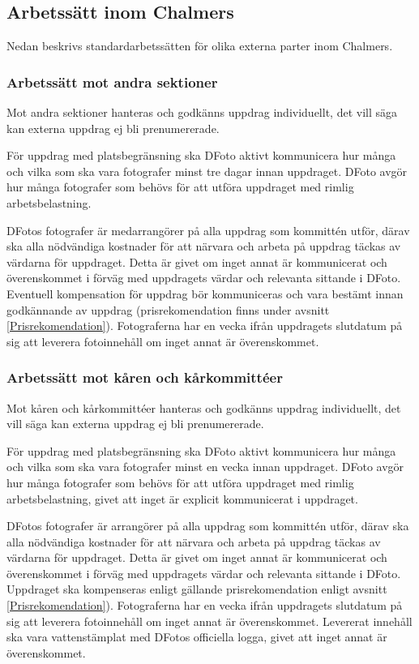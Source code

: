 \subsection{Arbetssätt inom Chalmers}
Nedan beskrivs standardarbetssätten för olika externa parter inom Chalmers. 

\subsubsection{Arbetssätt mot andra sektioner}
Mot andra sektioner hanteras och godkänns uppdrag individuellt, det vill säga kan externa uppdrag ej bli prenumererade.  

För uppdrag med platsbegränsning ska DFoto aktivt kommunicera hur många och vilka som ska vara fotografer minst tre dagar innan uppdraget. DFoto avgör hur många fotografer som behövs för att utföra uppdraget med rimlig arbetsbelastning. 

DFotos fotografer är medarrangörer på alla uppdrag som kommittén utför, därav ska alla nödvändiga kostnader för att närvara och arbeta på uppdrag täckas av värdarna för uppdraget. Detta är givet om inget annat är kommunicerat och överenskommet i förväg med uppdragets värdar och relevanta sittande i DFoto. Eventuell kompensation för uppdrag bör kommuniceras och vara bestämt innan godkännande av uppdrag (prisrekomendation finns under avsnitt \ref{Prisrekomendation}). Fotograferna har en vecka ifrån uppdragets slutdatum på sig att leverera fotoinnehåll om inget annat är överenskommet. 

\subsubsection{Arbetssätt mot kåren och kårkommittéer}
\label{Arbetssätt - Arbetssätt mot kåren och kårkommittéer}
Mot kåren och kårkommittéer hanteras och godkänns uppdrag individuellt, det vill säga kan externa uppdrag ej bli prenumererade.  

För uppdrag med platsbegränsning ska DFoto aktivt kommunicera hur många och vilka som ska vara fotografer minst en vecka innan uppdraget. DFoto avgör hur många fotografer som behövs för att utföra uppdraget med rimlig arbetsbelastning, givet att inget är explicit kommunicerat i uppdraget. 

DFotos fotografer är arrangörer på alla uppdrag som kommittén utför, därav ska alla nödvändiga kostnader för att närvara och arbeta på uppdrag täckas av värdarna för uppdraget. Detta är givet om inget annat är kommunicerat och överenskommet i förväg med uppdragets värdar och relevanta sittande i DFoto. Uppdraget ska kompenseras enligt gällande prisrekomendation enligt avsnitt \ref{Prisrekomendation}). Fotograferna har en vecka ifrån uppdragets slutdatum på sig att leverera fotoinnehåll om inget annat är överenskommet. Levererat innehåll ska vara vattenstämplat med DFotos officiella logga, givet att inget annat är överenskommet. 

